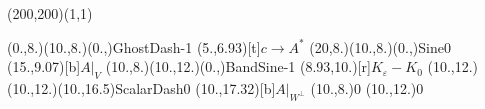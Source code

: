 \unitlength=1bp%

\begin{feynartspicture}(200,200)(1,1)

\FADiagram{}
\FAProp(0.,8.)(10.,8.)(0.,){GhostDash}{-1}
\FALabel(5.,6.93)[t]{$c\to A^*$}
\FAProp(20,8.)(10.,8.)(0.,){Sine}{0}
\FALabel(15.,9.07)[b]{$A|_V$}
\FAProp(10.,8.)(10.,12.)(0.,){BandSine}{-1}
\FALabel(8.93,10.)[r]{$K_\varepsilon-K_0$}
\FAProp(10.,12.)(10.,12.)(10.,16.5){ScalarDash}{0}
\FALabel(10.,17.32)[b]{$A|_{W^\perp}$}
\FAVert(10.,8.){0}
\FAVert(10.,12.){0}
\end{feynartspicture}

